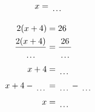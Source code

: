 \documentclass[12pt]{article}
\newcounter{minipagecount}
\begin{document}
\begin{multicols}{2}
\begin{minipage}[t]{0.45\textwidth}
\begin{align*}
        x &= \dotuline{\hspace{5mm}}\\
    \end{align*}
\end{minipage} %
\noindent{(\theminipagecount)}\hspace{0.1mm} %
\begin{minipage}[t]{0.45\textwidth} %
    \vspace{-26pt}  %
    \raggedright %
    \begin{align*} %
        2(x + 4) &= 26\\
        \frac{2(x+4)}{\dotuline{\hspace{5mm}}} &= \frac{26}{\dotuline{\hspace{5mm}}}\\
        x + 4 &= \dotuline{\hspace{5mm}}\\
        x + 4 - \dotuline{\hspace{5mm}} &= \dotuline{\hspace{5mm}} - \dotuline{\hspace{5mm}}\\
        x &= \dotuline{\hspace{5mm}}\\
    \end{align*}
\end{minipage} %
\noindent{(\theminipagecount)}\hspace{0.1mm} %
\begin{minipage}[t]{0.45\textwidth} %
    \vspace{-26pt}  %

\end{minipage}
\end{multicols}
\end{document}
